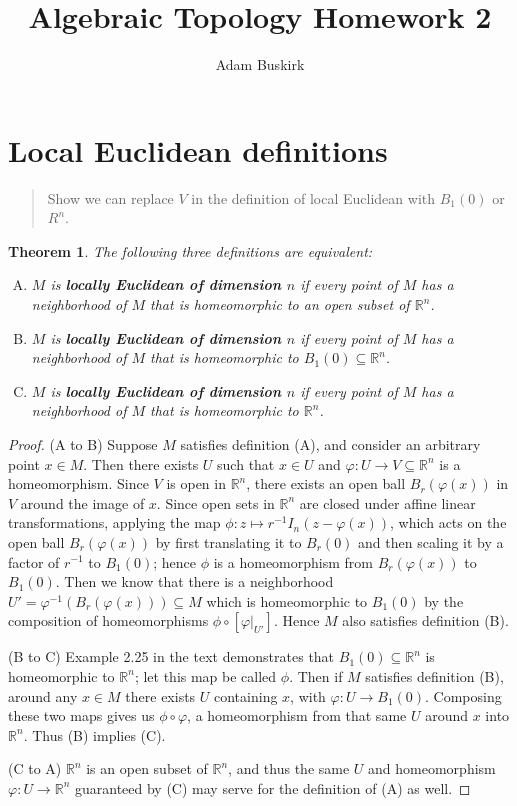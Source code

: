 \documentclass{article}
\title{Algebraic Topology Homework 2}
\author{Adam Buskirk}
\newtheorem{theorem}[subsection]{Theorem}
\theoremstyle{definition}
\newcommand{\R}{\mathbb{R}}
\newcommand{\sq}[1]{\left[#1\right]}
\begin{document}
\maketitle

\section{Local Euclidean definitions}
\begin{quote}
Show we can replace $V$ in the definition of local Euclidean with
$B_1(0)$ or $R^n$.
\end{quote}
\begin{theorem}
The following three definitions are equivalent:
\begin{enumerate}[(A)]
\item $M$ is \textbf{locally Euclidean of dimension $n$} if every point of $M$ has a 
neighborhood of $M$ that is homeomorphic to an open subset of $\R^n$.
\item $M$ is \textbf{locally Euclidean of dimension $n$} if every point of $M$ has a 
neighborhood of $M$ that is homeomorphic to $B_1(0) \subseteq \R^n$.
\item $M$ is \textbf{locally Euclidean of dimension $n$} if every point of $M$ has a 
neighborhood of $M$ that is homeomorphic to $\R^n$.
\end{enumerate}
\end{theorem}
\begin{proof}
(A to B) Suppose $M$ satisfies definition (A), and consider an arbitrary point 
$x \in M$. Then there exists $U$ such that $x \in U$ and 
$\varphi : U \to V \subseteq \R^n$ is a homeomorphism. Since $V$ is open in $\R^n$,
there exists an open ball $B_r(\varphi(x))$ in $V$ around the image of $x$. Since open
sets in $\R^n$ are closed under affine linear transformations, applying the map
$\phi : z \mapsto r^{-1} I_n (z-\varphi(x))$, which acts on the open ball $B_r(\varphi(x))$
by first translating it to $B_r(0)$ and then scaling it by a factor of $r^{-1}$ to
$B_1(0)$; hence $\phi$ is a homeomorphism from $B_r(\varphi(x))$ to $B_1(0)$. Then we know
that there is a neighborhood $U'=\varphi^{-1}(B_r(\varphi(x))) \subseteq M$ which is 
homeomorphic to $B_1(0)$ by the composition of homeomorphisms 
$\phi \circ \sq{\varphi|_{U'}}$. Hence $M$ also satisfies definition (B).

(B to C) Example 2.25 in the text demonstrates that $B_1(0) \subseteq \R^n$ is 
homeomorphic to $\R^n$; let this map be called $\phi$. Then if $M$ satisfies
definition (B), around any $x \in M$ there exists $U$ containing $x$, with
$\varphi : U \to B_1(0)$. Composing these two maps gives us $\phi \circ \varphi$,
a homeomorphism from that same $U$ around $x$ into $\R^n$. Thus (B) implies (C).

(C to A) $\R^n$ is an open subset of $\R^n$, and thus the same $U$ and homeomorphism 
$\varphi : U \to \R^n$ guaranteed by (C) may serve for the definition of (A) as well.
\end{proof}
\end{document}
